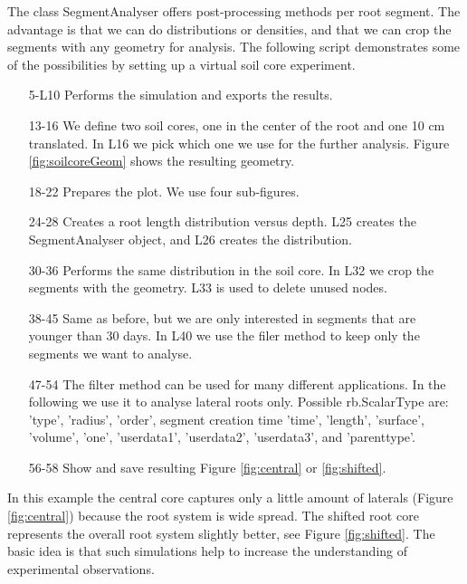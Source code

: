 \documentclass[a4paper]{article}
\begin{document}
The class SegmentAnalyser offers post-processing methods per root segment. 
The advantage is that we can do distributions or densities, and that we can crop the segments with any geometry for analysis. 
The following script demonstrates some of the possibilities by setting up a virtual soil core experiment. 



\begin{itemize}

\item[5-L10] Performs the simulation and exports the results.

\item[13-16] We define two soil cores, one in the center of the root and one 10 cm translated. In L16 we pick which one we use for the further analysis.  Figure \ref{fig:soilcoreGeom} shows the resulting geometry.

\item[18-22] Prepares the plot. We use four sub-figures. 

\item[24-28] Creates a root length distribution versus depth. L25 creates the SegmentAnalyser object, and L26 creates the distribution.

\item[30-36] Performs the same distribution in the soil core. In L32 we crop the segments with the geometry. L33 is used to delete unused nodes. 

\item[38-45] Same as before, but we are only interested in segments that are younger than 30 days. In L40 we use the filer method to keep only the segments we want to analyse. 

\item[47-54] The filter method can be used for many different applications. In the following we use it to analyse lateral roots only. Possible rb.ScalarType are: 
'type', 'radius', 'order', segment creation time 'time', 'length', 'surface', 'volume', 'one', 'userdata1', 'userdata2', 'userdata3', and 'parenttype'.
\item[56-58] Show and save resulting Figure \ref{fig:central} or \ref{fig:shifted}.

\end{itemize}

In this example the central core captures only a little amount of laterals (Figure \ref{fig:central}) because the root system is wide spread. 
The shifted root core represents the overall root system slightly better, see Figure \ref{fig:shifted}.  
The basic idea is that such simulations help to increase the understanding of experimental observations.
\end{document}
